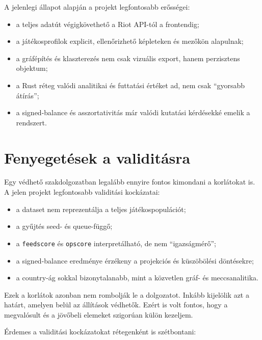\documentclass[a4paper,12pt]{report}
\begin{document}
A jelenlegi állapot alapján a projekt legfontosabb erősségei:

\begin{itemize}
    \item a teljes adatút végigkövethető a Riot API-tól a frontendig;
    \item a játékosprofilok explicit, ellenőrizhető képleteken és mezőkön alapulnak;
    \item a gráfépítés és klaszterezés nem csak vizuális export, hanem perzisztens objektum;
    \item a Rust réteg valódi analitikai és futtatási értéket ad, nem csak ``gyorsabb átírás'';
    \item a signed-balance és asszortativitás már valódi kutatási kérdésekké emelik a rendszert.
\end{itemize}

\section{Fenyegetések a validitásra}

Egy védhető szakdolgozatban legalább ennyire fontos kimondani a korlátokat is. A jelen projekt legfontosabb validitási kockázatai:

\begin{itemize}
    \item a dataset nem reprezentálja a teljes játékospopulációt;
    \item a gyűjtés seed- és queue-függő;
    \item a \texttt{feedscore} és \texttt{opscore} interpretálható, de nem ``igazságmérő'';
    \item a signed-balance eredménye érzékeny a projekciós és küszöbölési döntésekre;
    \item a country-ág sokkal bizonytalanabb, mint a közvetlen gráf- és meccsanalitika.
\end{itemize}

Ezek a korlátok azonban nem rombolják le a dolgozatot. Inkább kijelölik azt a határt, amelyen belül az állítások védhetők. Ezért is volt fontos, hogy a megvalósult és a jövőbeli elemeket szigorúan külön kezeljem.

Érdemes a validitási kockázatokat rétegenként is szétbontani:
\end{document}
